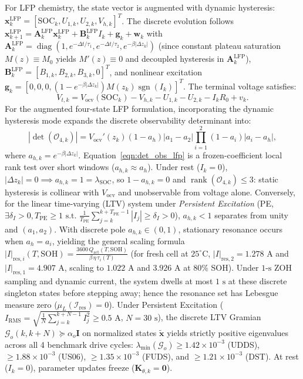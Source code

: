 \documentclass[balance,nocopyright,upint,varvw,hyphenate,barcolor=NavyBlue,nolists]{asmejour}
\begin{document}
For LFP chemistry, the state vector is augmented with dynamic hysteresis: $\mathbf{x}_k^{\text{LFP}} = [\text{SOC}_k, U_{1,k}, U_{2,k}, V_{h,k}]^T$. The discrete evolution follows $\mathbf{x}_{k+1}^{\text{LFP}} = \mathbf{A}_k^{\text{LFP}} \mathbf{x}_k^{\text{LFP}} + \mathbf{B}_k^{\text{LFP}} I_k + \mathbf{g}_k + \mathbf{w}_k$ with $\mathbf{A}_k^{\text{LFP}} = \operatorname{diag}(1, e^{-\Delta t/\tau_1}, e^{-\Delta t/\tau_2}, e^{-\beta|\Delta z_k|})$ (since constant plateau saturation $M(z) \equiv M_0$ yields $M'(z) \equiv 0$ and decoupled hysteresis in $\mathbf{A}_k^{\text{LFP}}$), $\mathbf{B}_k^{\text{LFP}} = [B_{1,k}, B_{2,k}, B_{3,k}, 0]^T$, and nonlinear excitation $\mathbf{g}_k = [0, 0, 0, (1 - e^{-\beta |\Delta z_k|}) M(z_k) \operatorname{sgn}(I_k)]^T$. The terminal voltage satisfies:
\begin{equation}\label{eqn:vt_lfp}
V_{t,k} = V_{\text{ocv}}(\text{SOC}_k) - V_{h,k} - U_{1,k} - U_{2,k} - I_k R_0 + v_k.
\end{equation}
For the augmented four-state LFP formulation, incorporating the dynamic hysteresis mode expands the discrete observability determinant into:
\begin{equation}\label{eqn:det_obs_lfp}
|\det(\mathcal{O}_{4,k})| = V_{\text{ocv}}'(z_k)(1 - a_h)|a_1 - a_2|\prod_{i=1}^2 (1 - a_i)|a_i - a_h|,
\end{equation}
where $a_{h,k} = e^{-\beta |\Delta z_k|}$. Equation~\eqref{eqn:det_obs_lfp} is a frozen-coefficient local rank test over short windows ($a_{h,k} \approx a_h$). Under rest ($I_k = 0$), $|\Delta z_k| = 0 \implies a_{h,k} = 1 = \lambda_{\text{SOC}}$, so $1 - a_{h,k} = 0$ and $\operatorname{rank}(\mathcal{O}_{4,k}) \le 3$: static hysteresis is collinear with $V_{\text{ocv}}$ and unobservable from voltage alone. Conversely, for the linear time-varying (LTV) system under \emph{Persistent Excitation} (PE, $\exists \delta_I > 0, T_{\text{PE}} \ge 1 \text{ s.t. } \frac{1}{T_{\text{PE}}} \sum_{j=k}^{k+T_{\text{PE}}-1} |I_j| \ge \delta_I > 0$), $a_{h,k} < 1$ separates from unity and $(a_1, a_2)$. With discrete pole $a_{h,k} \in (0, 1)$, stationary resonance occurs when $a_{h} = a_i$, yielding the general scaling formula $|I|_{\text{res},i}(T, \text{SOH}) = \frac{3600\,Q_{\text{act}}(T, \text{SOH})}{\beta\,\eta\,\tau_i(T)}$ (for fresh cell at $25^\circ\text{C}$, $|I|_{\text{res},2} = 1.278\text{ A}$ and $|I|_{\text{res},1} = 4.907\text{ A}$, scaling to $1.022\text{ A}$ and $3.926\text{ A}$ at $80\%$ SOH). Under $1\text{-s}$ ZOH sampling and dynamic current, the system dwells at most $1\text{ s}$ at these discrete singleton states before stepping away; hence the resonance set has Lebesgue measure zero ($\mu_L(\mathcal{I}_{\text{res}}) = 0$). Under Persistent Excitation ($I_{\text{RMS}} = \sqrt{\frac{1}{N}\sum_{j=k}^{k+N-1} I_j^2} \ge 0.5\text{ A}$, $N = 30\text{ s}$), the discrete LTV Gramian $\mathcal{G}_o(k, k+N) \succeq \alpha_o \mathbf{I}$ on normalized states $\tilde{\mathbf{x}}$ yields strictly positive eigenvalues across all 4 benchmark drive cycles: $\lambda_{\min}(\mathcal{G}_o) \ge 1.42 \times 10^{-3}$ (UDDS), $\ge 1.88 \times 10^{-3}$ (US06), $\ge 1.35 \times 10^{-3}$ (FUDS), and $\ge 1.21 \times 10^{-3}$ (DST). At rest ($I_k = 0$), parameter updates freeze ($\mathbf{K}_{\theta,k} = \mathbf{0}$).
\end{document}
